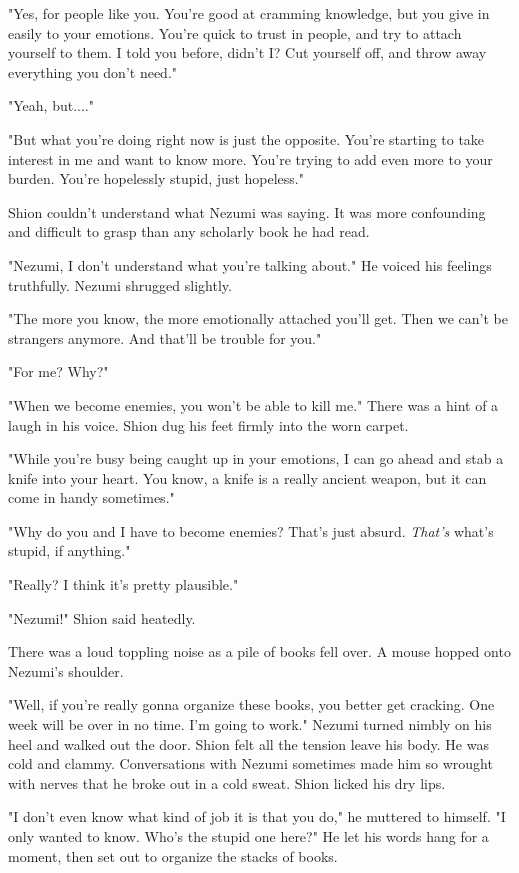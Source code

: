 "Yes, for people like you. You're good at cramming knowledge, but you
give in easily to your emotions. You're quick to trust in people, and
try to attach yourself to them. I told you before, didn't I? Cut
yourself off, and throw away everything you don't need."

"Yeah, but...."

"But what you're doing right now is just the opposite. You're starting
to take interest in me and want to know more. You're trying to add even
more to your burden. You're hopelessly stupid, just hopeless."

Shion couldn't understand what Nezumi was saying. It was more
confounding and difficult to grasp than any scholarly book he had read.

"Nezumi, I don't understand what you're talking about." He voiced his
feelings truthfully. Nezumi shrugged slightly.

"The more you know, the more emotionally attached you'll get. Then we
can't be strangers anymore. And that'll be trouble for you."

"For me? Why?"

"When we become enemies, you won't be able to kill me." There was a hint
of a laugh in his voice. Shion dug his feet firmly into the worn carpet.

"While you're busy being caught up in your emotions, I can go ahead and
stab a knife into your heart. You know, a knife is a really ancient
weapon, but it can come in handy sometimes."

"Why do you and I have to become enemies? That's just absurd. \emph{That's}
what's stupid, if anything."

"Really? I think it's pretty plausible."

"Nezumi!" Shion said heatedly.

There was a loud toppling noise as a pile of books fell over. A mouse
hopped onto Nezumi's shoulder.

"Well, if you're really gonna organize these books, you better get
cracking. One week will be over in no time. I'm going to work." Nezumi
turned nimbly on his heel and walked out the door. Shion felt all the
tension leave his body. He was cold and clammy. Conversations with
Nezumi sometimes made him so wrought with nerves that he broke out in a
cold sweat. Shion licked his dry lips.

"I don't even know what kind of job it is that you do," he muttered to
himself. "I only wanted to know. Who's the stupid one here?" He let his
words hang for a moment, then set out to organize the stacks of books.

